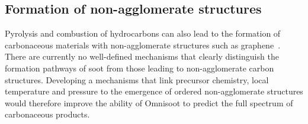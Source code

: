 \subsection{Formation of non-agglomerate structures}

Pyrolysis and combustion of hydrocarbons can also lead to the formation of carbonaceous materials with non-agglomerate structures such as graphene~\citep{dasappa2023deposition}. There are currently no well-defined mechanisms that clearly distinguish the formation pathways of soot from those leading to non-agglomerate carbon structures. Developing a mechanisms that link precursor chemistry, local temperature and pressure to the emergence of ordered non-agglomerate structures would therefore improve the ability of Omnisoot to predict the full spectrum of carbonaceous products.
